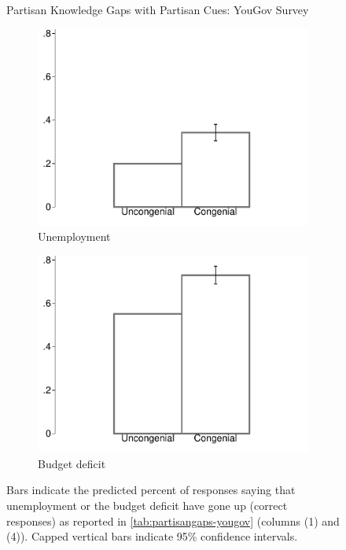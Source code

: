 \documentclass[12pt, letterpaper]{article}
\begin{document}
	\begin{figure}[t]
		\caption{Partisan Knowledge Gaps with Partisan Cues: YouGov Survey}	
		\centering
		\begin{subfigure}{.495\textwidth}\centering
			\includegraphics[width=\textwidth]{../figs/yougov-unemp-congenialcue.pdf}
			\caption{Unemployment}
		\end{subfigure}
		\hfil
		\begin{subfigure}{.495\textwidth}\centering
			\includegraphics[width=\textwidth]{../figs/yougov-deficit-congenialcue.pdf}
			\caption{Budget deficit}
		\end{subfigure}	
		\caption*{\footnotesize Bars indicate the predicted percent of responses saying that unemployment or the budget deficit have gone up (correct responses) as reported in \cref{tab:partisangaps-yougov} (columns (1) and (4)).  
			Capped vertical bars indicate 95\% confidence intervals.
		}
		\label{fig:yougov-reg}
	\end{figure}
	
\end{document}
